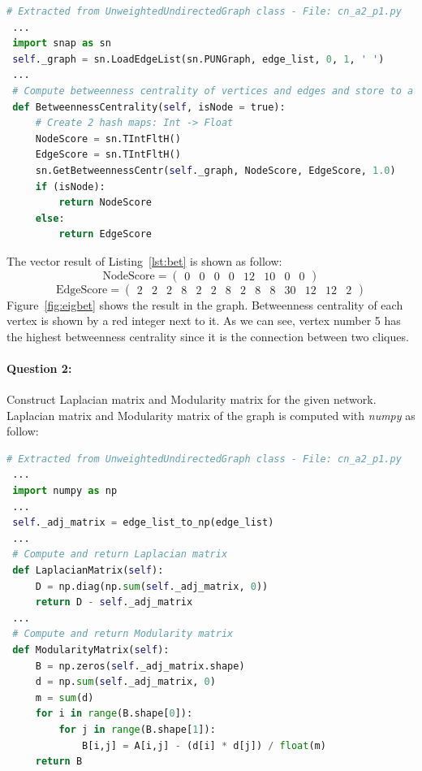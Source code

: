 \documentclass[a4paper,12pt]{article}
\begin{document}
\begin{lstlisting}[language=Python, caption={Betweenness centrality computation with SNAP.PY}, label={lst:bet}]
 # Extracted from UnweightedUndirectedGraph class - File: cn_a2_p1.py
 ...
 import snap as sn
 self._graph = sn.LoadEdgeList(sn.PUNGraph, edge_list, 0, 1, ' ')
 ...
 # Compute betweenness centrality of vertices and edges and store to a hash table.
 def BetweennessCentrality(self, isNode = true):
     # Create 2 hash maps: Int -> Float
     NodeScore = sn.TIntFltH()
     EdgeScore = sn.TIntFltH()
     sn.GetBetweennessCentr(self._graph, NodeScore, EdgeScore, 1.0)
     if (isNode):
         return NodeScore
     else:
         return EdgeScore
\end{lstlisting}

\pagebreak

\noindent
The vector result of Listing~\ref{lst:bet} is shown as follow:
\[ \mbox{NodeScore} = \left( \begin{array}{cccccccc} 0 & 0 & 0 & 0 & 12 & 10 & 0 & 0 \end{array} \right) \]
\[ \mbox{EdgeScore} = \left( \begin{array}{cccccccccccccc} 2 & 2 & 2 & 8 & 2 & 2 & 8 & 2 & 8 & 8 & 30 & 12 & 12 & 2 \end{array} \right) \]
\noindent
Figure~\ref{fig:eigbet} shows the result in the graph. Betweenness centrality of each vertex is shown by a red integer next to it. As we can see, vertex number 5 has the highest betweenness centrality since it is the connection between two cliques.

\paragraph{Question 2:} Construct Laplacian matrix and Modularity matrix for the given network.\\
\noindent
Laplacian matrix and Modularity matrix of the graph is computed with \emph{numpy} as follow:

\begin{lstlisting}[language=Python, caption={Laplacian matrix and Modularity matrix computation with Numpy}, label={lst:mat}]
 # Extracted from UnweightedUndirectedGraph class - File: cn_a2_p1.py
 ...
 import numpy as np
 ...
 self._adj_matrix = edge_list_to_np(edge_list)
 ...
 # Compute and return Laplacian matrix
 def LaplacianMatrix(self):
     D = np.diag(np.sum(self._adj_matrix, 0))
     return D - self._adj_matrix
 ...
 # Compute and return Modularity matrix
 def ModularityMatrix(self):
     B = np.zeros(self._adj_matrix.shape)
     d = np.sum(self._adj_matrix, 0)
     m = sum(d)
     for i in range(B.shape[0]):
         for j in range(B.shape[1]):
             B[i,j] = A[i,j] - (d[i] * d[j]) / float(m)
     return B
\end{lstlisting}
\end{document}
